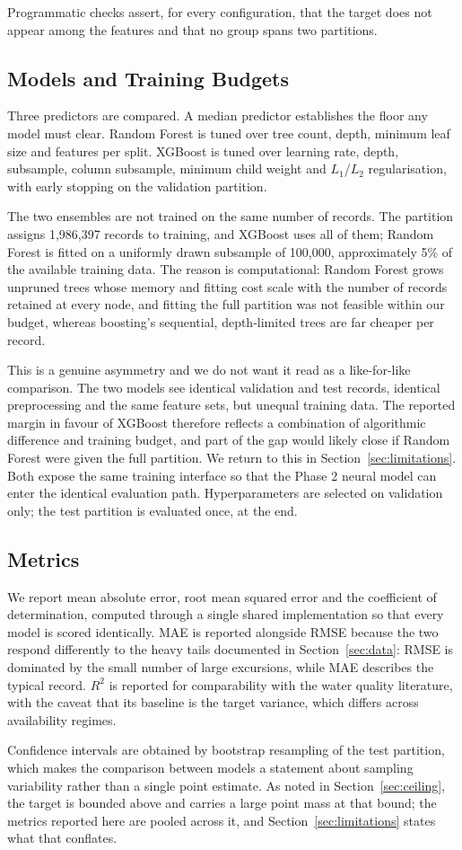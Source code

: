 Programmatic checks assert, for every configuration, that the target does not appear
among the features and that no group spans two partitions.

\subsection{Models and Training Budgets}
\label{sec:models}
Three predictors are compared. A median predictor establishes the floor any model must
clear. Random Forest is tuned over tree count, depth, minimum leaf size and features per
split. XGBoost is tuned over learning rate, depth, subsample, column subsample, minimum
child weight and $L_1$/$L_2$ regularisation, with early stopping on the validation
partition.

The two ensembles are not trained on the same number of records. The partition assigns
1{,}986{,}397 records to training, and XGBoost uses all of them; Random Forest is fitted
on a uniformly drawn subsample of 100{,}000, approximately 5\% of the available training
data. The reason is computational: Random Forest grows unpruned trees whose memory and
fitting cost scale with the number of records retained at every node, and fitting the
full partition was not feasible within our budget, whereas boosting's sequential,
depth-limited trees are far cheaper per record.

This is a genuine asymmetry and we do not want it read as a like-for-like comparison. The
two models see identical validation and test records, identical preprocessing and the
same feature sets, but unequal training data. The reported margin in favour of XGBoost
therefore reflects a combination of algorithmic difference and training budget, and part
of the gap would likely close if Random Forest were given the full partition. We return
to this in Section~\ref{sec:limitations}. Both expose the same training interface so that the Phase 2 neural model can
enter the identical evaluation path. Hyperparameters are selected on validation only; the
test partition is evaluated once, at the end.

\subsection{Metrics}
We report mean absolute error, root mean squared error and the coefficient of
determination, computed through a single shared implementation so that every model is
scored identically. MAE is reported alongside RMSE because the two respond differently to
the heavy tails documented in Section~\ref{sec:data}: RMSE is dominated by the small
number of large excursions, while MAE describes the typical record. $R^2$ is reported for
comparability with the water quality literature, with the caveat that its baseline is the
target variance, which differs across availability regimes.

Confidence intervals are obtained by bootstrap resampling of the test partition, which
makes the comparison between models a statement about sampling variability rather than a
single point estimate. As noted in Section~\ref{sec:ceiling}, the target is bounded above
and carries a large point mass at that bound; the metrics reported here are pooled across
it, and Section~\ref{sec:limitations} states what that conflates.
